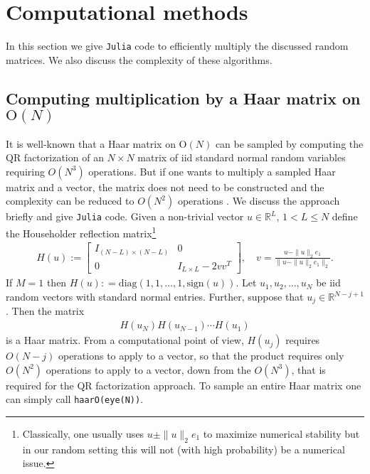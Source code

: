 \documentclass{amsart}
\theoremstyle{definition}
\theoremstyle{remark}
\numberwithin{equation}{section}
\begin{document}

\section{Computational methods}

In this section we give {\tt Julia} code to efficiently multiply the discussed random matrices.  We also discuss the complexity of these algorithms.

\subsection{Computing multiplication by a Haar matrix on $\mathrm{O}(N)$}\label{s:haar}

It is well-known that a Haar matrix on $\mathrm{O}(N)$ can be sampled by computing the QR factorization of an $N \times N$ matrix of iid standard normal random variables requiring $O(N^3)$ operations.  But if one wants to multiply a sampled Haar matrix and a vector, the matrix does not need to be constructed and the complexity can be reduced to $O(N^2)$ operations \cite{Stewart1980}.  We discuss the approach briefly and give {\tt Julia} code.  Given a non-trivial vector $u \in \mathbb R^L$, $1 < L \leq N$ define the Householder reflection matrix\footnote{Classically, one usually uses $u \pm \|u\|_2 e_1$ to maximize numerical stability but in our random setting this will not (with high probability) be a numerical issue.}
\begin{align}
  H(u) := \begin{bmatrix} I_{(N-L)\times (N-L)} & 0 \\ 0 & I_{L\times L} - 2 vv^T \end{bmatrix}, \quad v = \frac{u - \|u\|_2 e_1}{\|u - \|u\|_2 e_1\|_2}.
\end{align}
If $M =1$ then $H(u) : = \mathrm{diag}(1,1,\ldots,1,\mathrm{sign}(u))$.  Let $u_1,u_2,\ldots,u_{N}$ be iid random vectors with standard normal entries.  Further, suppose that $u_j \in \mathbb R^{N-j+1}$.  Then the matrix
\begin{align}
  H(u_N) H(u_{N-1}) \cdots H(u_1)
\end{align}
is a Haar matrix. From a computational point of view, $H(u_j)$ requires $O(N-j)$ operations to apply to a vector, so that the product requires only $O(N^2)$ operations to apply to a vector, down from the $O(N^3)$, that is required for the QR factorization approach.  To sample an entire Haar matrix one can simply call {\tt haarO(eye(N))}.
\end{document}
